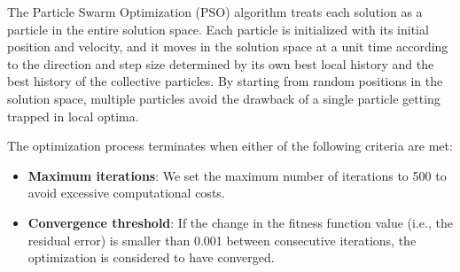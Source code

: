 \documentclass[3p,authoryear,preprint,12pt]{elsarticle}
\begin{document}
The Particle Swarm Optimization (PSO) algorithm treats each solution as a particle in the entire solution space. Each particle is initialized with its initial position and velocity, and it moves in the solution space at a unit time according to the direction and step size determined by its own best local history and the best history of the collective particles. By starting from random positions in the solution space, multiple particles avoid the drawback of a single particle getting trapped in local optima. 

{The optimization process terminates when either of the following criteria are met:}

\begin{itemize}
	\item \textbf{Maximum iterations}: We set the maximum number of iterations to 500 to avoid excessive computational costs.
	\item \textbf{Convergence threshold}: If the change in the fitness function value (i.e., the residual error) is smaller than 0.001 between consecutive iterations, the optimization is considered to have converged.
\end{itemize}
\end{document}
